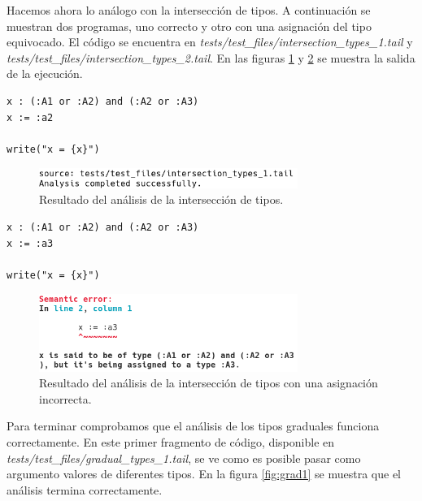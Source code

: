 Hacemos ahora lo análogo con la intersección de tipos. A continuación se muestran dos programas, uno correcto y otro con una asignación del tipo equivocado. El código se encuentra en \textit{tests/test\_files/intersection\_types\_1.tail} y \textit{tests/test\_files/intersection\_types\_2.tail}. En las figuras \ref{fig:in1} y \ref{fig:in2} se muestra la salida de la ejecución.\\

\begin{lstlisting}[style=tail]
x : (:A1 or :A2) and (:A2 or :A3)
x := :a2

write("x = {x}")
\end{lstlisting}

\begin{figure}[H]
	\begin{center}
		\includegraphics[width=0.75\textwidth]{imagenes/int1.png}
		\caption{Resultado del análisis de la intersección de tipos.}
		\label{fig:in1}
	\end{center}
\end{figure}

\begin{lstlisting}[style=tail]
x : (:A1 or :A2) and (:A2 or :A3)
x := :a3

write("x = {x}")
\end{lstlisting}

\begin{figure}[H]
	\begin{center}
		\includegraphics[width=0.75\textwidth]{imagenes/int2.png}
		\caption{Resultado del análisis de la intersección de tipos con una asignación incorrecta.}
		\label{fig:in2}
	\end{center}
\end{figure}


Para terminar comprobamos que el análisis de los tipos graduales funciona correctamente. En este primer fragmento de código, disponible en \textit{tests/test\_files/gradual\_types\_1.tail}, se ve como es posible pasar como argumento valores de diferentes tipos. En la figura \ref{fig:grad1} se muestra que el análisis termina correctamente.\\

